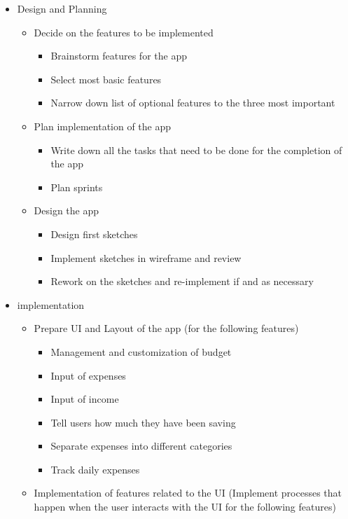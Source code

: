 \begin{itemize}
  \item Design and Planning
  \begin{itemize}
    \item Decide on the features to be implemented
    \begin{itemize}
      \item Brainstorm features for the app
      \item Select most basic features
      \item Narrow down list of optional features to the three most important
    \end{itemize}
    \item Plan implementation of the app
    \begin{itemize}
      \item Write down all the tasks that need to be done for the completion of the app
      \item Plan sprints
    \end{itemize}
    \item Design the app
    \begin{itemize}
      \item Design first sketches
      \item Implement sketches in wireframe and review
      \item Rework on the sketches and re-implement if and as necessary
    \end{itemize}
  \end{itemize}
  \item implementation
  \begin{itemize}
    \item Prepare UI and Layout of the app (for the following features)
    \begin{itemize}
      \item Management and customization of budget
      \item Input of expenses
      \item Input of income
      \item Tell users how much they have been saving
      \item Separate expenses into different categories
      \item Track daily expenses
    \end{itemize}
    \item Implementation of features related to the UI (Implement processes that happen when the user interacts with the UI for the following features)

\end{itemize}
\end{itemize}
